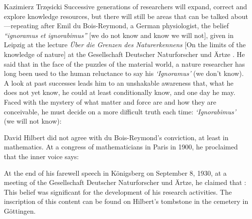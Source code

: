 \begin{artengenv}{Kazimierz Trzęsicki}
Successive generations of researchers will expand, correct and explore knowledge resources, but there will still be areas that can be talked about---repeating after Emil du Bois-Reymond, a German physiologist, the belief \emph{``ignoramus et ignorabimus''} [we do not know and know we will not], given in Leipzig at the lecture \emph{{\"U}ber die Grenzen des Naturerkennens} [On the limits of the knowledge of nature]  at the Gesellschaft Deutscher Naturforscher und {\"A}rtze \parencite{DuboisReymond1872,DuboisReymond1882}. He said that in the face of the puzzles of the material world, a nature researcher has long been used to the human reluctance to say his \emph{`Ignoramus'} (we don't know). A look at past successes leads him to an unshakable awareness that, what he does not yet know, he could at least conditionally know, and one day he may. Faced with the mystery of what matter and force are and how they are conceivable, he must decide on a more difficult truth each time: \emph{`Ignorabimus'} (we will not know): 

David Hilbert \parencite*{Hilbert1900} did not agree with du Bois-Reymond's conviction, at least in mathematics. At a congress of mathematicians in Paris in 1900, he proclaimed that the inner voice says: 

At the end of his farewell speech in Königsberg on September 8, 1930, at a meeting of the Gesellschaft Deutscher Naturforscher und {\"A}rtze, he claimed that \parencites[p.387] {Hilbert1935a}[see also][]{smith_david_2014}:  This belief was significant for the development of his research activities. The inscription of this content can be found on Hilbert's tombstone in the cemetery in G{\"o}ttingen.


\end{artengenv}
